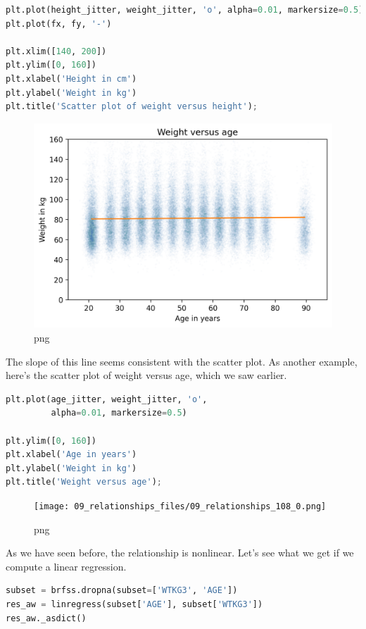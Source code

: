 \documentclass[
]{book}
\begin{document}
\begin{lstlisting}[language=Python]
plt.plot(height_jitter, weight_jitter, 'o', alpha=0.01, markersize=0.5)
plt.plot(fx, fy, '-')

plt.xlim([140, 200])
plt.ylim([0, 160])
plt.xlabel('Height in cm')
plt.ylabel('Weight in kg')
plt.title('Scatter plot of weight versus height');
\end{lstlisting}

\begin{figure}
\centering
\includegraphics{09_relationships_files/09_relationships_106_0.png}
\caption{png}
\end{figure}

The slope of this line seems consistent with the scatter plot. As
another example, here's the scatter plot of weight versus age, which we
saw earlier.

\begin{lstlisting}[language=Python]
plt.plot(age_jitter, weight_jitter, 'o', 
         alpha=0.01, markersize=0.5)

plt.ylim([0, 160])
plt.xlabel('Age in years')
plt.ylabel('Weight in kg')
plt.title('Weight versus age');
\end{lstlisting}

\begin{figure}
\centering
\texttt{[image: 09\_relationships\_files/09\_relationships\_108\_0.png]}
\caption{png}
\end{figure}

As we have seen before, the relationship is nonlinear. Let's see what we
get if we compute a linear regression.

\begin{lstlisting}[language=Python]
subset = brfss.dropna(subset=['WTKG3', 'AGE']) 
res_aw = linregress(subset['AGE'], subset['WTKG3'])
res_aw._asdict()
\end{lstlisting}
\end{document}
